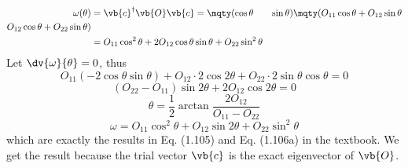 \documentclass[a4paper]{article}
\begin{document}
\begin{equation}\label{key}
\begin{aligned}
\omega(\theta) &= \vb{c}^\dagger \vb{O} \vb{c} = \mqty(\cos\theta & \sin\theta) \mqty(O_{11}\cos\theta + O_{12}\sin\theta\\ O_{12}\cos\theta + O_{22}\sin\theta)\\
&= O_{11}\cos^2\theta + 2O_{12}\cos\theta\sin\theta + O_{22}\sin^2\theta\\
\end{aligned}
\end{equation}
Let $ \dv{\omega}{\theta} = 0 $, thus
\begin{equation}\label{key}
O_{11} (-2\cos\theta\sin\theta) + O_{12}\cdot 2\cos 2\theta + O_{22}\cdot 2\sin\theta\cos\theta = 0
\end{equation}
\begin{equation}\label{key}
(O_{22}-O_{11})\sin 2\theta + 2O_{12}\cos 2\theta = 0
\end{equation}
\begin{equation}\label{key}
\theta = \dfrac{1}{2}\arctan\dfrac{2O_{12}}{O_{11}-O_{22}}
\end{equation}
\begin{equation}\label{key}
\omega = O_{11}\cos^2\theta + O_{12}\sin 2\theta + O_{22}\sin^2\theta
\end{equation}
which are exactly the results in Eq. (1.105) and Eq. (1.106a) in the textbook. We get the result because the trial vector $ \vb{c} $ is the exact eigenvector of $ \vb{O} $.
\end{document}
